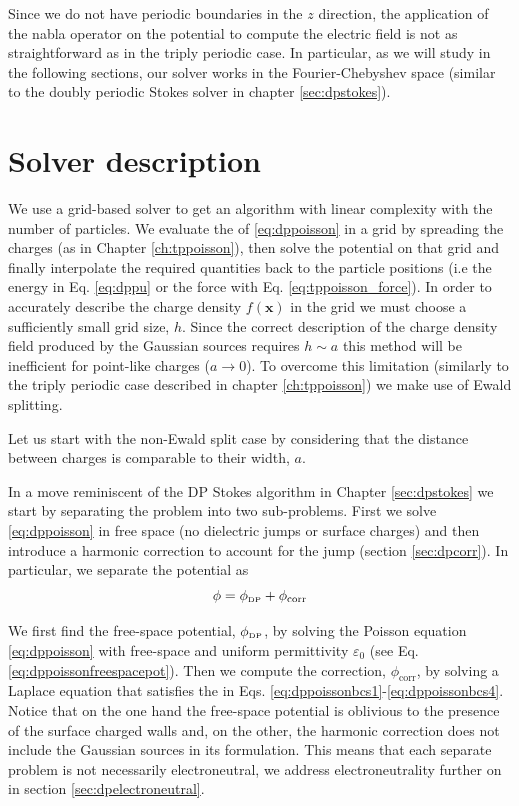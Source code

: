 \documentclass[twoside,openright,titlepage,numbers=noenddot,%
headinclude,footinclude,cleardoublepage=empty,abstract=on,
BCOR=5mm,fontsize=11pt, dvipsnames, paper=b5
]{scrreprt}
\renewcommand{\vec}[1]{\bm{#1}}
\newcommand{\corr}{\text{corr}}
\newcommand{\dpr}{\text{\tiny DP}}
\begin{document}
Since we do not have periodic boundaries in the $z$ direction, the application of the nabla operator on the potential to compute the electric field is not as straightforward as in the triply periodic case. In particular, as we will study in the following sections, our solver works in the Fourier-Chebyshev space (similar to the doubly periodic Stokes solver in chapter \ref{sec:dpstokes}).

\section{Solver description}
We use a grid-based solver to get an algorithm with linear complexity with the number of particles. We evaluate the \rhs of \eqref{eq:dppoisson} in a grid by spreading the charges (as in Chapter \ref{ch:tppoisson}), then solve the potential on that grid and finally interpolate the required quantities back to the particle positions (i.e the energy in Eq. \eqref{eq:dppu} or the force with Eq. \eqref{eq:tppoisson_force}).
In order to accurately describe the charge density $f(\vec{x})$ in the grid we must choose a sufficiently small grid size, $h$. Since the correct description of the charge density field produced by the Gaussian sources requires $h \sim a$ this method will be inefficient for point-like charges ($a\rightarrow 0$). To overcome this limitation (similarly to the triply periodic case described in chapter \ref{ch:tppoisson}) we make use of Ewald splitting.

Let us start with the non-Ewald split case by considering that the distance between charges is comparable to their width, $a$.

In a move reminiscent of the \gls{DP} Stokes algorithm in Chapter \ref{sec:dpstokes} we start by separating the problem into two sub-problems. First we solve \eqref{eq:dppoisson} in free space (no dielectric jumps or surface charges) and then introduce a harmonic correction to account for the jump \bcs (section \ref{sec:dpcorr}). In particular, we separate the potential as
\begin{equation}
  \label{eq:dppoissonpotsep}
  \phi = \phi_{\dpr} + \phi_{\corr}
\end{equation}


We first find the free-space potential, $\phi_{\dpr}$, by solving the Poisson equation \eqref{eq:dppoisson} with free-space \bcs and uniform permittivity $\varepsilon_0$ (see Eq. \eqref{eq:dppoissonfreespacepot}). Then we compute the correction, $\phi_{\corr}$, by solving a Laplace equation that satisfies the \bcs in Eqs. \eqref{eq:dppoissonbcs1}-\eqref{eq:dppoissonbcs4}.
Notice that on the one hand the free-space potential is oblivious to the presence of the surface charged walls and, on the other, the harmonic correction does not include the Gaussian sources in its formulation. This means that each separate problem is not necessarily electroneutral, we address electroneutrality further on in section \ref{sec:dpelectroneutral}.
\end{document}
